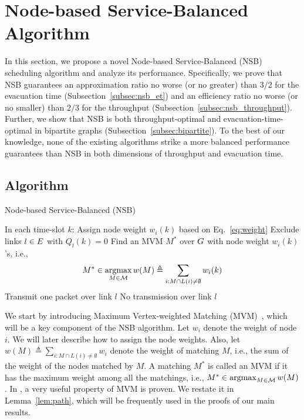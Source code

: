 \documentclass[10pt,journal,compsoc]{IEEEtran}
\begin{document}
\section{Node-based Service-Balanced Algorithm} \label{sec:nsb}
In this section, we propose a novel Node-based Service-Balanced (NSB) scheduling algorithm and 
analyze its performance. Specifically, we prove that NSB guarantees an approximation ratio no worse 
(or no greater) than $3/2$ for the evacuation time (Subsection~\ref{subsec:nsb_et}) and an efficiency 
ratio no worse (or no smaller) than $2/3$ for the throughput (Subsection~\ref{subsec:nsb_throughput}). 
Further, we show that NSB is both throughput-optimal and evacuation-time-optimal in bipartite graphs 
(Subsection~\ref{subsec:bipartite}). To the best of our knowledge, none of the existing algorithms strike 
a more balanced performance guarantees than NSB in both dimensions of throughput and evacuation time.

\subsection{Algorithm} \label{subsec:nsb_alg}



\begin{algorithm}[!t]
\caption{Node-based Service-Balanced (NSB)}
\begin{algorithmic}[1]
\label{alg:nsb}
\STATE In each time-slot $k$:
\STATE Assign node weight $w_i(k)$ based on Eq.~\eqref{eq:weight}
\ENDFOR
\STATE Exclude links $l \in E$ with $Q_l(k)=0$
\STATE Find an MVM $M^*$ over $G$ with node weight $w_i(k)$'s, i.e., 
\[
M^* \in \argmax_{M \in \Matching} w(M) \triangleq \sum_{i: M \cap L(i) \neq \emptyset} w_i(k)
\]
\STATE Transmit one packet over link $l$
\ELSE
\STATE No transmission over link $l$
\ENDIF
\ENDFOR
\end{algorithmic}
\end{algorithm} 

We start by introducing Maximum Vertex-weighted Matching (MVM)~\cite{spencer84,guptathesis}, 
which will be a key component of the NSB algorithm. Let $w_i$ denote the weight of node $i$. 
We will later describe how to assign the node weights. Also, let $w(M) \triangleq \sum_{i: M \cap L(i) \neq \emptyset} w_i$ 
denote the weight of matching $M$, i.e., the sum of the weight of the nodes matched by $M$. A matching $M^*$ is called 
an MVM if it has the maximum weight among all the matchings, i.e., $M^* \in \argmax_{M \in \Matching} w(M)$. 
In \cite{spencer84}, a very useful property of MVM is proven.
We restate it in Lemma~\ref{lem:path}, which will be frequently used in 
the proofs of our main results.
\end{document}
